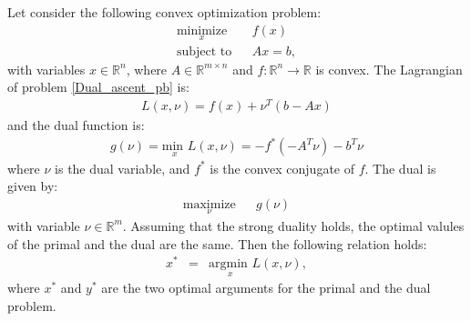 \itshape\documentclass{article}
\begin{document}
	Let consider the following convex optimization problem:
\begin{eqnarray}
\label{Dual_ascent_pb}
\underset{x}{\text{minimize}} & & f(x) \\
\text{subject to} & & Ax = b, \nonumber
\end{eqnarray}
with variables $x \in \mathbb{R}^n$, where $A \in \mathbb{R}^{m \times n}$ and $ f : \mathbb{R}^n \to \mathbb{R}$ is convex. 
The Lagrangian of problem \ref{Dual_ascent_pb} is:
\begin{eqnarray*}
\label{Dual_ascent_Lag}
L(x,\nu) = f(x) + \nu^T (b - Ax)
\end{eqnarray*}
and the dual function is:
\begin{eqnarray*}
g(\nu) = \underset{x}{\text{min }} L(x, \nu) = - f^{*}(-A^T \nu) - b^T \nu
\end{eqnarray*}
where $\nu $ is the dual variable, and $f^*$ is the convex conjugate of $f$. The dual is given by:
\begin{eqnarray*}
\underset{\nu}{\text{maximize}} & & g(\nu)
\end{eqnarray*}
with variable $\nu \in \mathbb{R}^m$. Assuming that the strong duality holds, the optimal valules of the primal and the dual are the same. Then the following relation holds:
\begin{eqnarray*}
x^* &=& \underset{x}{\text{argmin }} L(x, \nu),
\end{eqnarray*}
where $x^*$ and $y^*$ are the two optimal arguments for the primal and the dual problem.
\end{document}

